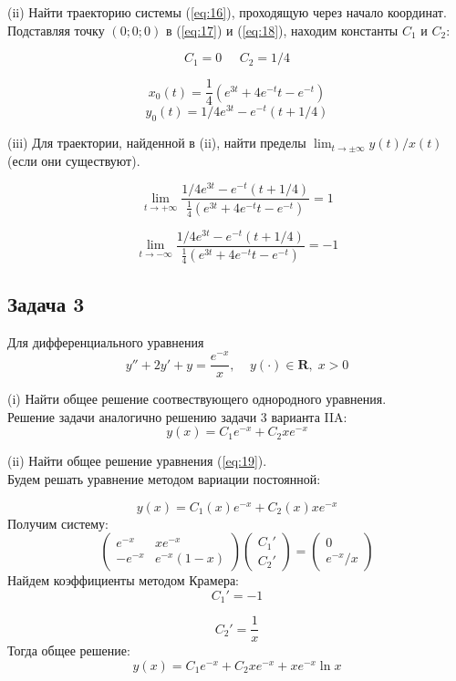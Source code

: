 \documentclass[a4paper, 12pt]{article}
\begin{document}
(ii) Найти траекторию системы (\ref{eq:16}), проходящую через начало координат.\\
Подставляя точку $(0;0;0)$ в (\ref{eq:17}) и (\ref{eq:18}), находим константы $C_1$ и $C_2$:

\[C_1 = 0\;\;\;\;\; C_2 = 1/4\]

\[
x_0(t) =\frac 1 4 (e^{3t}+4e^{-t}t-e^{-t})\]\[
y_0(t) = 1/4e^{3t}-e^{-t}(t+1/4)
\]

(iii) Для траектории, найденной в (ii), найти пределы $\lim_{t\rightarrow\pm\infty}y(t)/x(t)$ (если они существуют).


\[\lim_{t\rightarrow+\infty}\frac{1/4e^{3t}-e^{-t}(t+1/4)}{\frac 1 4 (e^{3t}+4e^{-t}t-e^{-t})}=1 \]

\[\lim_{t\rightarrow-\infty}\frac{1/4e^{3t}-e^{-t}(t+1/4)}{\frac 1 4 (e^{3t}+4e^{-t}t-e^{-t})}=-1\]





	\subsection {Задача 3}
Для дифференциального уравнения 
\begin{equation}
y''+2y'+y=\frac{e^{-x}}{x}, \;\;\;\; y(\cdot)\in \textbf{R},\; x>0
\label{eq:19}
\end{equation}

(i) Найти общее решение соотвествующего однородного уравнения.\\
Решение задачи аналогично решению задачи 3 варианта IIA:
\[y(x) = C_1e^{-x}+C_2xe^{-x}\]

(ii) Найти общее решение уравнения (\ref{eq:19}).\\
Будем решать уравнение методом вариации постоянной:

\[y(x)= C_1(x)e^{-x}+C_2(x)xe^{-x}\]
Получим систему:
\[ \left(
\begin{array}{cc}
e^{-x} & xe^{-x} \\
-e^{-x} & e^{-x}(1-x)
\end{array}
\right) \left(
\begin{array}{c}
C_1' \\
C_2'
\end{array} 
\right)= \left(
\begin{array}{c}
0 \\
e^{-x}/x
\end{array}
\right) \]
Найдем коэффициенты методом Крамера:
\[C_1' = -1\]

\[C_2' = \frac 1  {x}\]
Тогда общее решение:
\[y(x) = C_1e^{-x}+C_2xe^{-x}+xe^{-x}\ln{x}\]
\end{document}
